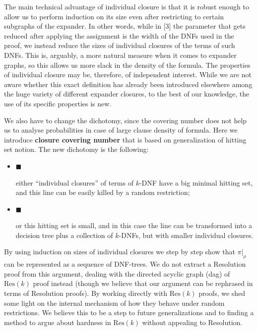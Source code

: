 The main technical advantage of individual closure is that it is robust enough to allow us to perform induction
on its size even after restricting to certain subgraphs of the expander.
In other words, while in [3]
the parameter that gets reduced after applying the assignment is the width of the
DNFs used in the proof, we instead reduce the sizes of individual closures of the terms of such
DNFs. This is, arguably, a more natural measure when it comes to expander graphs, so this allows us more
slack in the density of the formula. The properties of individual closure may be, therefore, of
independent interest. While we are not aware whether this exact definition has already been introduced
elsewhere among the huge variety of different expander closures, to the best of our knowledge, the use of
its specific properties is new.\par




We also have to change the dichotomy, since the covering number does not help us to analyse probabilities
in case of large clause density of formula. Here we introduce \textbf{closure covering number} that is
based on generalization of hitting set notion. The new dichotomy is the following:\par


\begin{itemize}


\item[] 
$\blacksquare$ 


either “individual closures” of terms of $k$-DNF have a big minimal hitting set, and this
line can be easily killed by a random restriction;\par





\item[] 
$\blacksquare$ 


or this hitting set is small, and in this case the line can be transformed into a decision tree
plus a collection of $k$-DNFs, but with smaller individual closures.\par





\end{itemize}


By using induction on sizes of individual closures we step by step show that $\pi|_{\rho}$ can be
represented as a sequence of DNF-trees. We do not extract a Resolution proof from this argument,
dealing with the directed acyclic graph (dag) of $\mathrm{Res}(k)$ proof instead (though we believe that our argument can be rephrased in
terms of Resolution proofs). By working directly with $\mathrm{Res}(k)$ proofs, we shed some light on the
internal mechanism of how they behave under random restrictions. We believe this to be a step to future
generalizations and to finding a method to argue about hardness in $\mathrm{Res}(k)$ without appealing to
Resolution.\par






